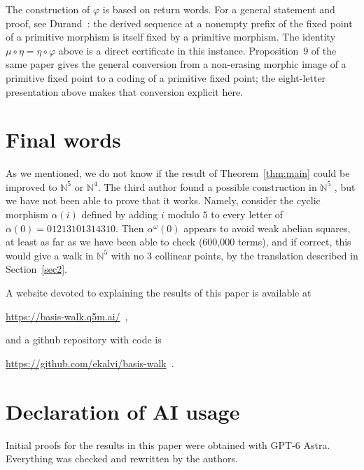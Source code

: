 \documentclass[12pt,reqno]{article}
\newcommand{\N}{\mathbb N}
\begin{document}
The construction of $\varphi$ is based on return words.
For a general statement and proof, see Durand~\cite[Proposition~19]{Dur98}:
the derived sequence at a nonempty prefix of the fixed point of a primitive morphism
is itself fixed by a primitive morphism. The identity
$\mu\circ\eta=\eta\circ\varphi$ above is a direct certificate in this instance.
Proposition~9 of the same paper gives the general conversion from a
non-erasing morphic image of a primitive fixed point to a coding of
a primitive fixed point; the eight-letter presentation above makes
that conversion explicit here. 

\section{Final words}

As we mentioned, we do not know if the result of Theorem~\ref{thm:main} could be improved to $\N^5$ or $\N^4$.  The third author found a possible construction in $\N^5$ 
\cite{Sha26},
but we have not been able to prove that it works.  Namely, consider the cyclic
morphism $\alpha(i)$ defined by adding $i$ modulo $5$
to every letter of $\alpha(0)=01213101314310$.  Then $\alpha^\omega (0)$ appears
to avoid weak abelian squares, at least as far as we have been able to check (600,000 terms), and if correct, this would give a walk in $\N^5$ with no $3$ collinear points, by the translation described in Section~\ref{sec2}.

A website devoted to explaining the results of this paper is available at\\
\centerline{\url{https://basis-walk.q5m.ai/}\, ,} and a github repository with code is\\
\centerline{\url{https://github.com/ekalvi/basis-walk}\, .}

\section*{Declaration of AI usage}

Initial proofs for the results in this paper were obtained with GPT-6 Astra. Everything was checked and rewritten by the authors.
\end{document}
